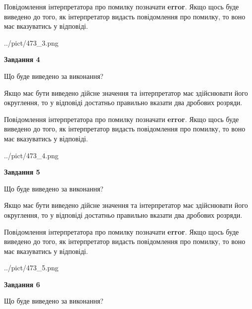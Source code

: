 \documentclass[12pt, ukrainian]{article}
\begin{document}
{\begin {Large}
Повідомлення інтерпретатора про помилку позначати \textbf{error}.
Якщо щось буде виведено до того, як інтерпретатор видасть повідомлення про помилку, 
то воно має вказуватись у відповіді. \par

\begin{center}
	{../pict/473_3.png}
\end{center}
\newpage

{\begin {center}\textbf{Завдання 4}\end {center}}\par
Що буде виведено за виконання? \par

Якщо має бути виведено дійсне значення та інтерпретатор має здійснювати його округлення, 
то у відповіді достатньо правильно вказати два дробових розряди.

Повідомлення інтерпретатора про помилку позначати \textbf{error}.
Якщо щось буде виведено до того, як інтерпретатор видасть повідомлення про помилку, 
то воно має вказуватись у відповіді. \par

\begin{center}
	{../pict/473_4.png}
\end{center}
\newpage

{\begin {center}\textbf{Завдання 5}\end {center}}\par
Що буде виведено за виконання? \par

Якщо має бути виведено дійсне значення та інтерпретатор має здійснювати його округлення, 
то у відповіді достатньо правильно вказати два дробових розряди.

Повідомлення інтерпретатора про помилку позначати \textbf{error}.
Якщо щось буде виведено до того, як інтерпретатор видасть повідомлення про помилку, 
то воно має вказуватись у відповіді. \par

\begin{center}
	{../pict/473_5.png}
\end{center}
\newpage

{\begin {center}\textbf{Завдання 6}\end {center}}\par
Що буде виведено за виконання? \par


\end{Large}}
\end{document}
